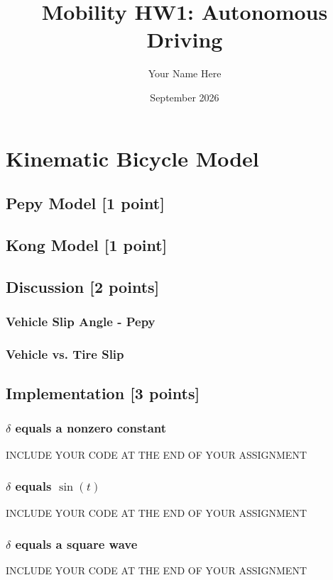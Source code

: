 \documentclass{article}
\title{Mobility HW1: Autonomous Driving}
\author{Your Name Here}
\date{September 2026}
\begin{document}
\maketitle

\section{Kinematic Bicycle Model}\label{sec:vehicleControl}

\subsection{Pepy Model [1 point]}

\subsection{Kong Model [1 point]}

\subsection{Discussion [2 points]}

\subsubsection{Vehicle Slip Angle - Pepy}

\subsubsection{Vehicle vs. Tire Slip}

\subsection{Implementation [3 points]}

\subsubsection{$\delta$ equals a nonzero constant}
INCLUDE YOUR CODE AT THE END OF YOUR ASSIGNMENT

\subsubsection{$\delta$ equals $\sin(t)$}
INCLUDE YOUR CODE AT THE END OF YOUR ASSIGNMENT

\subsubsection{$\delta$ equals a square wave}
INCLUDE YOUR CODE AT THE END OF YOUR ASSIGNMENT
\end{document}
